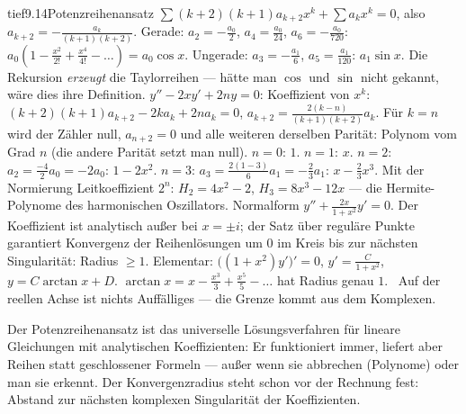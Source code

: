 \begin{loesungkarte}{tief}{9.14}{Potenzreihenansatz}
$\sum(k + 2)(k + 1)a_{k+2}x^{k} + \sum a_kx^{k} = 0$, also $a_{k+2} = -\frac{a_k}{(k + 1)(k + 2)}$. Gerade: $a_2 = -\frac{a_0}2$, $a_4 = \frac{a_0}{24}$, $a_6 = -\frac{a_0}{720}$: $a_0(1 - \frac{x^{2}}{2!} + \frac{x^{4}}{4!} - \dots) = a_0\cos x$. Ungerade: $a_3 = -\frac{a_1}6$, $a_5 = \frac{a_1}{120}$: $a_1\sin x$. Die Rekursion \emph{erzeugt} die Taylorreihen --- hätte man $\cos$ und $\sin$ nicht gekannt, wäre dies ihre Definition.
$y'' - 2xy' + 2ny = 0$: Koeffizient von $x^{k}$: $(k + 2)(k + 1)a_{k+2} - 2ka_k + 2na_k = 0$, $a_{k+2} = \frac{2(k - n)}{(k + 1)(k + 2)}a_k$. Für $k = n$ wird der Zähler null, $a_{n+2} = 0$ und alle weiteren derselben Parität: Polynom vom Grad $n$ (die andere Parität setzt man null). $n = 0$: $1$. $n = 1$: $x$. $n = 2$: $a_2 = \frac{-4}2a_0 = -2a_0$: $1 - 2x^{2}$. $n = 3$: $a_3 = \frac{2(1 - 3)}6a_1 = -\frac23a_1$: $x - \frac23x^{3}$. Mit der Normierung Leitkoeffizient $2^{n}$: $H_2 = 4x^{2} - 2$, $H_3 = 8x^{3} - 12x$ --- die Hermite-Polynome des harmonischen Oszillators.
Normalform $y'' + \frac{2x}{1 + x^{2}}y' = 0$. Der Koeffizient ist analytisch außer bei $x = \pm i$; der Satz über reguläre Punkte garantiert Konvergenz der Reihenlösungen um $0$ im Kreis bis zur nächsten Singularität: Radius $\ge1$. Elementar: $\bigl((1 + x^{2})y'\bigr)' = 0$, $y' = \frac C{1 + x^{2}}$, $y = C\arctan x + D$. $\arctan x = x - \frac{x^{3}}3 + \frac{x^{5}}5 - \dots$ hat Radius genau $1$. \checkmark\ Auf der reellen Achse ist nichts Auffälliges --- die Grenze kommt aus dem Komplexen.
\begin{mitnehmen}\kastentext
Der Potenzreihenansatz ist das universelle Lösungsverfahren für lineare Gleichungen mit analytischen Koeffizienten: Er funktioniert immer, liefert aber Reihen statt geschlossener Formeln --- außer wenn sie abbrechen (Polynome) oder man sie erkennt. Der Konvergenzradius steht schon vor der Rechnung fest: Abstand zur nächsten komplexen Singularität der Koeffizienten.
\end{mitnehmen}
\end{loesungkarte}

